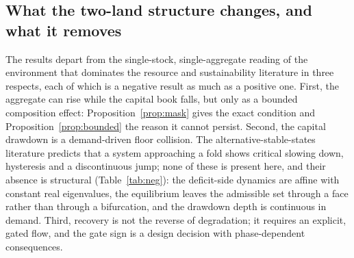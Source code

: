 \documentclass[preprint,12pt,authoryear]{elsarticle}
\begin{document}
\subsection{What the two-land structure changes, and what it removes}

The results depart from the single-stock, single-aggregate reading of the environment that dominates the resource and sustainability literature \citep{Schaefer1954,May1973,Meadows1972,Meadows2004,WackernagelRees1996,BranderTaylor1998} in three respects, each of which is a negative result as much as a positive one. First, the aggregate can rise while the capital book falls, but only as a bounded composition effect: Proposition~\ref{prop:mask} gives the exact condition and Proposition~\ref{prop:bounded} the reason it cannot persist. Second, the capital drawdown is a demand-driven floor collision. The alternative-stable-states literature \citep{Scheffer2001} predicts that a system approaching a fold shows critical slowing down, hysteresis and a discontinuous jump; none of these is present here, and their absence is structural (Table~\ref{tab:neg}): the deficit-side dynamics are affine with constant real eigenvalues, the equilibrium leaves the admissible set through a face rather than through a bifurcation, and the drawdown depth is continuous in demand. Third, recovery is not the reverse of degradation; it requires an explicit, gated flow, and the gate sign is a design decision with phase-dependent consequences.
\end{document}
